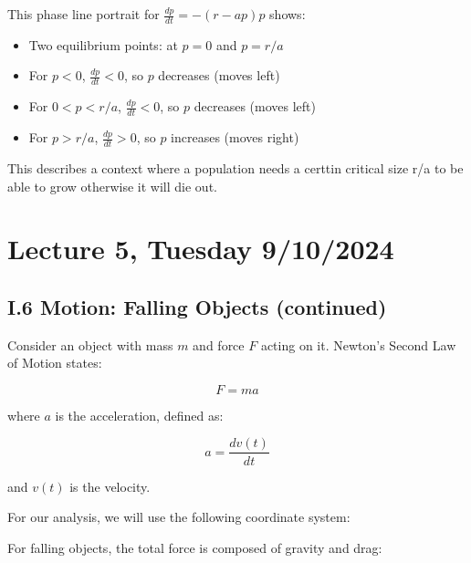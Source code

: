 \documentclass{article}
\begin{document}
\noindent This phase line portrait for $\frac{dp}{dt} = -(r-ap)p$ shows:
\begin{itemize}
    \item Two equilibrium points: at $p=0$ and $p=r/a$
    \item For $p < 0$, $\frac{dp}{dt} < 0$, so $p$ decreases (moves left)
    \item For $0 < p < r/a$, $\frac{dp}{dt} < 0$, so $p$ decreases (moves left)
    \item For $p > r/a$, $\frac{dp}{dt} > 0$, so $p$ increases (moves right)
\end{itemize}

This describes a context where a population needs a certtin critical size r/a to be able to grow otherwise it will die out.



\section*{Lecture 5, Tuesday 9/10/2024}

\subsection*{I.6 Motion: Falling Objects (continued)}

Consider an object with mass $m$ and force $F$ acting on it. Newton's Second Law of Motion states:

\[F = ma\]

where $a$ is the acceleration, defined as:

\[a = \frac{dv(t)}{dt}\]

and $v(t)$ is the velocity.

For our analysis, we will use the following coordinate system:



For falling objects, the total force is composed of gravity and drag:
\end{document}

